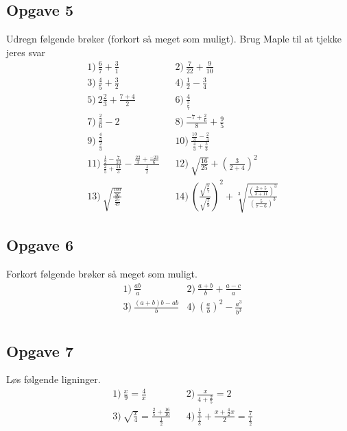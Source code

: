 \subsection*{Opgave 5}
Udregn følgende brøker (forkort så meget som muligt). Brug Maple til at tjekke jeres svar
\begin{align*}
	&1)\  \frac{6}{7} + \frac{3}{1}            &&2)\ \frac{7}{22} + \frac{9}{10}\\
 	&3)\ \frac{4}{5} + \frac{3}{2}      &&4)\ \frac{1}{2} - \frac{3}{4}\\
 	&5)\  2\frac{2}{3} + \frac{7+4}{2}              &&6)\ \frac{4}{\frac{5}{7}}\\
 	&7)\  \frac{\frac{2}{3}}{6} - 2           &&8)\ \frac{-7+\frac{2}{6}}{8} + \frac{9}{5}\\
	&9)\ \frac{\frac{4}{3}}{\frac{2}{3}} &&10)\ \frac{\frac{10}{3}-\frac{2}{4}}{\frac{4}{3}+\frac{5}{3}} \\
	&11)\  \frac{\frac{1}{2}-\frac{7}{10}}{\frac{2}{5}+\frac{11}{3}} -  \frac{\frac{22}{3}+ \frac{-23}{6}}{\frac{1}{2}}        &&12)\ \sqrt{\frac{16}{25}} + \left(\frac{3}{2+4}\right)^2\\
	&13)\ \sqrt{\frac{\frac{100}{36}}{\frac{25}{49}}} && 14) \   \left(\frac{\sqrt{\frac{5}{7}}}{\sqrt{\frac{2}{9}}}\right)^2 + \sqrt[3]{\frac{\left(\frac{2+5}{3+11}\right)^3}{\left( \frac{5}{7-6}\right)^3}}
\end{align*}

\subsection*{Opgave 6}
Forkort følgende brøker så meget som muligt. 
\begin{align*}
	&1) \ \frac{ab}{a}   &2) \  \frac{a+b}{b} + \frac{a-c}{a}    \\
	&3) \ \frac{(a+b)b-ab}{b}   &4) \  \left(\frac{a}{b}\right)^2 - \frac{a^3}{b^3}   \\
\end{align*}

\subsection*{Opgave 7}
Løs følgende ligninger.
\begin{align*}
	&1) \ \frac{x}{9} = \frac{4}{x}   &&2) \ \frac{x}{4+\frac{2}{5}} = 2     \\
	&3) \ \sqrt{\frac{x}{4}} = \frac{\frac{2}{5}+\frac{16}{10}}{\frac{1}{2}}    &&4) \ \frac{\frac{1}{4}}{\frac{1}{8}} + \frac{x+\frac{4}{2}x}{2} = \frac{7}{\frac{1}{2}}    \\
\end{align*}